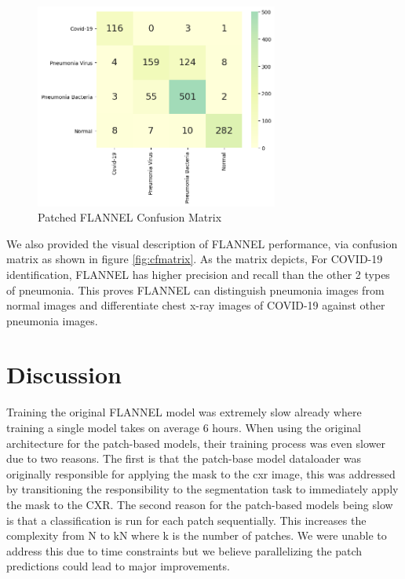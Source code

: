\documentclass{sigkddExp}
\begin{document}
\begin{figure}
    \centering
    \includegraphics[width=8cm]{../doc/images/patched_flannel_cf.png}
    \caption{Patched FLANNEL Confusion Matrix}
    \label{fig:p_cf}
\end{figure}




We also provided the visual description of FLANNEL performance, via confusion
matrix as shown in figure \ref{fig:cfmatrix}. As the matrix depicts, For
COVID-19 identification, FLANNEL has higher precision and recall than the other
2 types of pneumonia. This proves FLANNEL can distinguish pneumonia images from
normal images and differentiate chest x-ray images of COVID-19 against other
pneumonia images.


\section{Discussion}

Training the original FLANNEL model was extremely slow already where training a
single model takes on average 6 hours. When using the original architecture for
the patch-based models, their training process was even slower due to two
reasons. The first is that the patch-base model dataloader was originally
responsible for applying the mask to the cxr image, this was addressed by
transitioning the responsibility to the segmentation task to immediately apply
the mask to the CXR. The second reason for the patch-based models being slow is
that a classification is run for each patch sequentially. This increases the
complexity from N to kN where k is the number of patches. We were unable to
address this due to time constraints but we believe parallelizing the patch
predictions could lead to major improvements.
\end{document}
